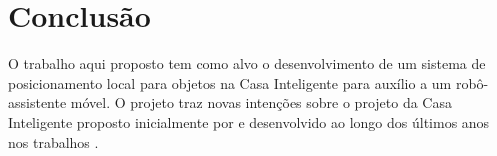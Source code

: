 \begin{table}[ht]
\caption{Cronograma Físico --- {\footnotesize REV: Revisão bibliográfica; IMPM: Implementação dos Métodos; IMPH: Implementação do Hardware; RED: Redação do texto; DAD: Captação de Dados; ART: Produção de artigos; TST: Testes; DEF: Defesa}\label{tab:cronograma}}
\end{table}


\section{Conclusão}
O trabalho aqui proposto tem como alvo o desenvolvimento de um sistema de posicionamento local para objetos na Casa Inteligente para auxílio a um robô-assistente móvel. O projeto traz novas intenções sobre o projeto da Casa Inteligente proposto inicialmente por \cite{Nascimento2002} e desenvolvido ao longo dos últimos anos nos trabalhos \cite{Botelho2005,Lima2005,Carvalho2008}.


